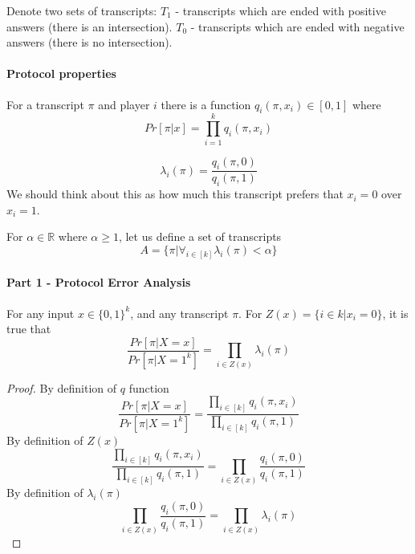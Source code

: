 \begin{definition}
    Denote two sets of transcripts: \newline
    $T_1$ - transcripts which are ended with positive answers (there is an intersection). \newline
    $T_0$ - transcripts which are ended with negative answers (there is no intersection).
\end{definition}

\paragraph{Protocol properties}
For a transcript $\pi$ and player $i$ there is a function $q_i(\pi, x_i) \in [0,1]$ where
\begin{equation*}
    Pr[\pi | x] = \prod_{i=1}^{k}q_i(\pi, x_i )
\end{equation*}

\begin{definition}
\begin{equation*}
    \lambda _i (\pi) = \frac{q_i(\pi, 0)}{q_i(\pi, 1)}
\end{equation*}
We should think about this as how much this transcript prefers that $x_i = 0$ over $x_i = 1$.
\end{definition}

\begin{definition}
For $\alpha \in \mathbb{R}$ where $\alpha \geq 1$, let us define a set of transcripts 
\begin{equation*}
    A = \{\pi | \forall_{i \in [k]} \lambda_i (\pi) < \alpha \}
\end{equation*}
\end{definition}


\paragraph{Part 1 - Protocol Error Analysis}
\begin{lemma}
For any input $x \in \{0,1\}^k$, and any transcript $\pi$. For $Z(x) = \{i \in k | x_i = 0\}$, it is true that  \newline
\begin{equation*}
    \frac{Pr[\pi | X = x]}{Pr[\pi | X = 1^k]} = \prod_{i \in Z(x)} \lambda_i(\pi)
\end{equation*}
\end{lemma}
\begin{proof}
By definition of $q$ function
\begin{equation*}
    \frac{Pr[\pi | X = x]}{Pr[\pi | X = 1^k]} = \frac{\prod_{i \in [k]} q_i (\pi, x_i)}{\prod_{i \in [k]} q_i (\pi, 1)}
\end{equation*}
By definition of $Z(x)$
\begin{equation*}
    \frac{\prod_{i \in [k]} q_i (\pi, x_i)}{\prod_{i \in [k]} q_i (\pi, 1)} = \prod_{i \in Z(x)} \frac{q_i (\pi, 0)}{q_i (\pi, 1)}
\end{equation*}
By definition of $\lambda_i (\pi)$
\begin{equation*}
    \prod_{i \in Z(x)} \frac{q_i (\pi, 0)}{q_i (\pi, 1)} = \prod_{i \in Z(x)} \lambda_i (\pi)
\end{equation*}
\end{proof}


